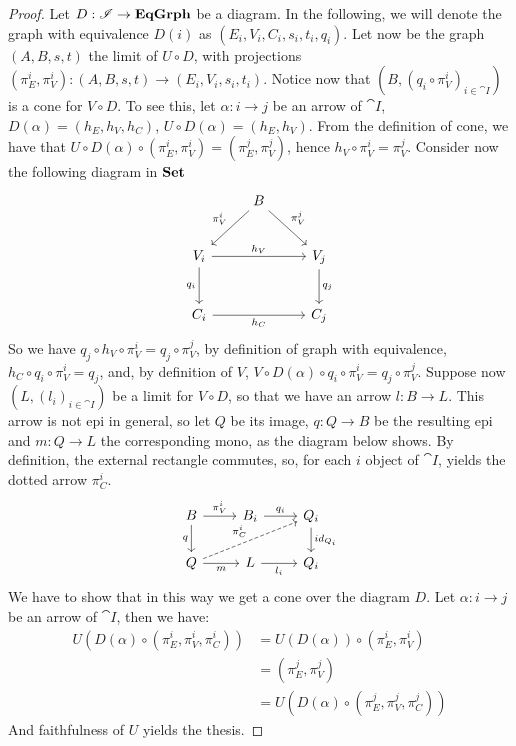 \begin{proof}
    Let $D : \mathscr{I} \to \mathbf{EqGrph}$ be a diagram. In the following, we will denote the graph with equivalence $D(i)$ as $(E_i, V_i, C_i, s_i, t_i, q_i)$.
    Let now be the graph $(A, B, s, t)$ the limit of $U \circ D$, with projections $(\pi_E^i, \pi_V^i):(A, B, s, t) \to (E_i, V_i, s_i, t_i)$. Notice now that $(B, (q_i\circ \pi_V^i)_{i \in \cat I})$ is a cone for $V \circ D$. To see this, let $\alpha : i \to j$ be an arrow of $\cat I$, $D(\alpha) = (h_E, h_V, h_C)$, $U \circ D (\alpha) = (h_E, h_V)$. From the definition of cone, we have that $U \circ D (\alpha) \circ (\pi_E^i, \pi_V^i) = (\pi_E^j, \pi_V^j)$, hence $h_V \circ \pi_V^i = \pi_V^j$. 
    Consider now the following diagram in $\mathbf{Set}$
    \[
        \begin{tikzcd}[row sep=25 pt, column sep = 25 pt]
            & B \arrow[dl, "{\pi_V^i}"swap] \arrow[dr, "{\pi_V^j}"] & \\
            V_i \arrow[rr, "{h_V}"] \arrow[d, "{q_i}" swap] & & V_j \arrow[d, "{q_j}"] \\
            C_i \arrow[rr, "{h_C}" swap] & & C_j 
        \end{tikzcd}
    \]
    So we have $q_j \circ h_V \circ \pi_V^i = q_j \circ \pi_V^j$, by definition of graph with equivalence, $h_C \circ q_i \circ \pi_V^i = q_j$, and, by definition of $V$, $V \circ D (\alpha) \circ q_i \circ \pi_V^i = q_j \circ \pi_V^j$.
    Suppose now $(L, (l_i)_{i \in \cat I})$ be a limit for $V \circ D$, so that we have an arrow $l: B \to L$. This arrow is not epi in general, so let $Q$ be its image, $q: Q \to B$ be the resulting epi and $m: Q \to L$ the corresponding mono, as the diagram below shows. By definition, the external rectangle commutes, so, for each $i$ object of $\cat I$,  yields the dotted arrow $\pi_C^i$.
    \[
        \begin{tikzcd}
            B \arrow[r, "{\pi_V^i}"] \arrow[d, "q" swap] & B_ i \arrow[r, "{q_i}"] & Q_i \arrow[d, "{id_{Q_i}}"] \\
            Q \arrow[urr, dashed, "\pi_C^i"] \arrow[r, "m" swap] &L \arrow[r, "{l_i}"swap] & Q_i
        \end{tikzcd}
    \]
    We have to show that in this way we get a cone over the diagram $D$. Let $\alpha : i\to j$ be an arrow of $\cat{I}$, then we have:
    \begin{align*}
    U(D(\alpha)\circ (\pi_E^i, \pi_V^i, \pi_C^i))  &=  U(D(\alpha))\circ(\pi_E^i, \pi_V^i)\\
                                                   &=  (\pi_E^j, \pi_V^j)\\
                                                   &=  U(D(\alpha)\circ (\pi_E^j, \pi_V^j, \pi_C^j))
    \end{align*}
    And faithfulness of $U$ yields the thesis.


\end{proof}
